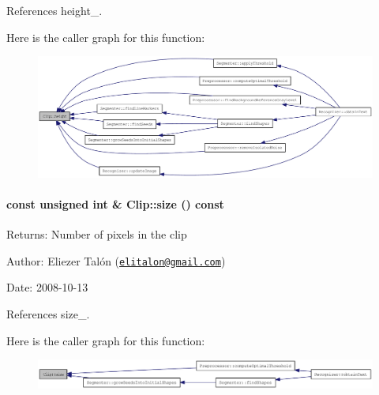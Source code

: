 References height\_\-.

Here is the caller graph for this function:\nopagebreak
\begin{figure}[H]
\begin{center}
\leavevmode
\includegraphics[width=420pt]{class_clip_939908a8dde602d25335792cc0fd5d97_icgraph}
\end{center}
\end{figure}
\hypertarget{class_clip_eb6b12a1a0570b529d6a09633b991fcd}{
\paragraph[size]{\setlength{\rightskip}{0pt plus 5cm}const unsigned int \& Clip::size () const}\hfill}
\label{class_clip_eb6b12a1a0570b529d6a09633b991fcd}


\begin{Desc}
\item[Returns:]Number of pixels in the clip\end{Desc}
\begin{Desc}
\item[Author:]Eliezer Talón (\href{mailto:elitalon@gmail.com}{\tt elitalon@gmail.com}) \end{Desc}
\begin{Desc}
\item[Date:]2008-10-13 \end{Desc}


References size\_\-.

Here is the caller graph for this function:\nopagebreak
\begin{figure}[H]
\begin{center}
\leavevmode
\includegraphics[width=397pt]{class_clip_eb6b12a1a0570b529d6a09633b991fcd_icgraph}
\end{center}
\end{figure}
